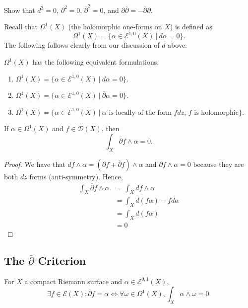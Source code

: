 \documentclass{article}
\begin{document}
{\begin{exercise}
    Show that $d^2 = 0$, $\partial^2 = 0$, $\overline{\partial}^2 = 0$, and $\partial \overline{\partial} = -\overline{\partial} \partial$.
\end{exercise}

Recall that $\Omega^1(X)$ (the holomorphic one-forms on $X$) is defined as
\[\Omega^1(X) = \{\alpha \in \mathcal{E}^{1, 0}(X)\ |\ d\alpha = 0\}. \]
The following follows clearly from our discussion of $d$ above:
\begin{lemma}
    $\Omega^1(X)$ has the following equivalent formulations,
    \begin{enumerate}
        \item $\Omega^1(X) = \{\alpha \in \mathcal{E}^{1, 0}(X)\ |\ d\alpha = 0\}$.
        \item $\Omega^1(X) = \{\alpha \in \mathcal{E}^{1, 0}(X)\ |\ \overline{\partial}\alpha = 0\}$.
        \item $\Omega^1(X) = \{\alpha \in \mathcal{E}^{1, 0}(X)\ |\ \alpha \text{ is locally of the form $f dz$, $f$ is holomorphic}\}$.
    \end{enumerate}
\end{lemma}

\begin{lemma}\label{lem::lemma-criterion}
    If $\alpha \in \Omega^1(X)$ and $f \in \mathcal{D}(X)$, then
    \[\int_X \overline{\partial} f \wedge \alpha = 0.\]
\end{lemma}

\begin{proof}
    We have that $df \wedge \alpha = (\partial f + \overline{\partial} f) \wedge \alpha$ and $\partial f \wedge \alpha = 0$ because they are both $dz$ forms (anti-symmetry). Hence, 
    \begin{align*}
        \int_X \overline{\partial} f \wedge \alpha &= \int_X df \wedge \alpha\\
        &= \int_X d(f\alpha) -  f d\alpha \tag*{Product Rule}\\
        &= \int_X d(f\alpha) \tag*{$d\alpha = 0$}\\
        &= 0 \tag*{The support of $f\alpha$ is compact (adpating Stoke's Theorem with Partition of Unity)}
    \end{align*}
\end{proof}

\subsection{The $\overline{\partial}$ Criterion}
\begin{theorem}
    For $X$ a compact Riemann surface and $\alpha \in \mathcal{E}^{0, 1}(X)$,
    \[\exists f \in \mathcal{E}(X): \overline{\partial} f = \alpha \iff \forall \omega \in \Omega^1(X), \int_X \alpha \wedge \omega = 0.\]
\end{theorem}

}
\end{document}
